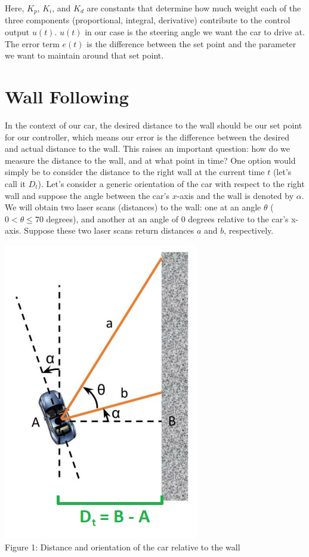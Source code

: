 \documentclass[a4 paper]{article}
\begin{document}
Here, $K_p$, $K_i$, and $K_d$ are constants that determine how much weight each of the three components (proportional, integral, derivative) contribute to the control output $u(t)$. $u(t)$ in our case is the steering angle we want the car to drive at. The error term $e(t)$ is the difference between the set point and the parameter we want to maintain around that set point.

\section{Wall Following}

In the context of our car, the desired distance to the wall should be our set point for our controller, which means our error is the difference between the desired and actual distance to the wall. This raises an important question: how do we measure the distance to the wall, and at what point in time? One option would simply be to consider the distance to the right wall at the current time $t$ (let's call it $D_t$). Let's consider a generic orientation of the car with respect to the right wall and suppose the angle between the car's $x$-axis and the wall is denoted by $\alpha$. We will obtain two laser scans (distances) to the wall: one at an angle $\theta$ ($0 < \theta \leq 70$ degrees), and another at an angle of 0 degrees relative to the car's x-axis. Suppose these two laser scans return distances $a$ and $b$, respectively.\\

\begin{center}
	\includegraphics[scale=0.75]{wall_following_lab_figure_1.png}\\
	\label{fig:fig1}
	Figure 1: Distance and orientation of the car relative to the wall
\end{center}
\end{document}
